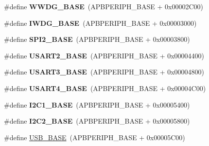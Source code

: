 \begin{DoxyCompactItemize}
\mbox{\label{group___peripheral__memory__map_ga9a5bf4728ab93dea5b569f5b972cbe62}} 
\#define {\bfseries W\+W\+D\+G\+\_\+\+B\+A\+SE}~(A\+P\+B\+P\+E\+R\+I\+P\+H\+\_\+\+B\+A\+SE + 0x00002\+C00)
\item 
\mbox{\label{group___peripheral__memory__map_ga8543ee4997296af5536b007cd4748f55}} 
\#define {\bfseries I\+W\+D\+G\+\_\+\+B\+A\+SE}~(A\+P\+B\+P\+E\+R\+I\+P\+H\+\_\+\+B\+A\+SE + 0x00003000)
\item 
\mbox{\label{group___peripheral__memory__map_gac3e357b4c25106ed375fb1affab6bb86}} 
\#define {\bfseries S\+P\+I2\+\_\+\+B\+A\+SE}~(A\+P\+B\+P\+E\+R\+I\+P\+H\+\_\+\+B\+A\+SE + 0x00003800)
\item 
\mbox{\label{group___peripheral__memory__map_gade83162a04bca0b15b39018a8e8ec090}} 
\#define {\bfseries U\+S\+A\+R\+T2\+\_\+\+B\+A\+SE}~(A\+P\+B\+P\+E\+R\+I\+P\+H\+\_\+\+B\+A\+SE + 0x00004400)
\item 
\mbox{\label{group___peripheral__memory__map_gabe0d6539ac0026d598274ee7f45b0251}} 
\#define {\bfseries U\+S\+A\+R\+T3\+\_\+\+B\+A\+SE}~(A\+P\+B\+P\+E\+R\+I\+P\+H\+\_\+\+B\+A\+SE + 0x00004800)
\item 
\mbox{\label{group___peripheral__memory__map_gafa384bb1e7d610a806f7c1f1dbc72ac5}} 
\#define {\bfseries U\+S\+A\+R\+T4\+\_\+\+B\+A\+SE}~(A\+P\+B\+P\+E\+R\+I\+P\+H\+\_\+\+B\+A\+SE + 0x00004\+C00)
\item 
\mbox{\label{group___peripheral__memory__map_gacd72dbffb1738ca87c838545c4eb85a3}} 
\#define {\bfseries I2\+C1\+\_\+\+B\+A\+SE}~(A\+P\+B\+P\+E\+R\+I\+P\+H\+\_\+\+B\+A\+SE + 0x00005400)
\item 
\mbox{\label{group___peripheral__memory__map_ga04bda70f25c795fb79f163b633ad4a5d}} 
\#define {\bfseries I2\+C2\+\_\+\+B\+A\+SE}~(A\+P\+B\+P\+E\+R\+I\+P\+H\+\_\+\+B\+A\+SE + 0x00005800)
\item 
\#define \hyperlink{group___peripheral__memory__map_gaa6c4cbed4ddbb3ecd77de93fab2a2e04}{U\+S\+B\+\_\+\+B\+A\+SE}~(A\+P\+B\+P\+E\+R\+I\+P\+H\+\_\+\+B\+A\+SE + 0x00005\+C00)

\end{DoxyCompactItemize}
